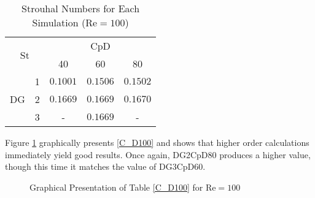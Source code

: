 \begin{table}[H]
	\centering
	\def\arraystretch{1.5}
	\begin{tabular}{|c|c|c|c|c|}
		\hline
		\multicolumn{2}{|c|}{\multirow{2}{*}{St}} & \multicolumn{3}{c|}{CpD} \\ \cline{3-5} 
		\multicolumn{2}{|c|}{}                       & 40     & 60    & 80    \\ \hline
		\multirow{3}{*}{DG}            & 1           &    $0.1001$    &    $0.1506$   &    $0.1502$    \\ \cline{2-5} 
		& 2           &     $0.1669$   &    $0.1669$   &     $0.1670$   \\ \cline{2-5} 
		& 3           &     -   &    $0.1669$   &    -    \\ \hline
	\end{tabular}
	\caption{Strouhal Numbers for Each Simulation ($\text{Re} = 100$)}	
	\label{Str100}
\end{table}
Figure \ref{fig:C_D100} graphically presents \cref{C_D100} and shows that higher order calculations immediately yield good results. Once again, DG2CpD80 produces a higher value, though this time it matches the value of DG3CpD60. 
	\begin{figure}[htp]	
		\centering
		\caption{Graphical Presentation of Table \ref{C_D100} for $\text{Re} = 100$}
		\label{fig:C_D100}	
	\end{figure}

